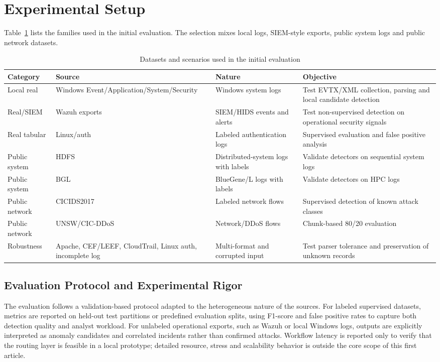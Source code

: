 \documentclass[conference]{IEEEtran}
\begin{document}
\section{Experimental Setup}
Table~\ref{tab:datasets} lists the families used in the initial evaluation. The selection mixes local logs, SIEM-style exports, public system logs and public network datasets.

\begin{table}[t]
\caption{Datasets and scenarios used in the initial evaluation}
\label{tab:datasets}
\centering
\scriptsize
\begin{tabularx}{\textwidth}{p{2.2cm}p{3.1cm}p{2.8cm}X}
\toprule
\textbf{Category} & \textbf{Source} & \textbf{Nature} & \textbf{Objective} \\
\midrule
Local real & Windows Event/Application/System/Security & Windows system logs & Test EVTX/XML collection, parsing and local candidate detection \\
Real/SIEM & Wazuh exports & SIEM/HIDS events and alerts & Test non-supervised detection on operational security signals \\
Real tabular & Linux/auth & Labeled authentication logs & Supervised evaluation and false positive analysis \\
Public system & HDFS & Distributed-system logs with labels & Validate detectors on sequential system logs \\
Public system & BGL & BlueGene/L logs with labels & Validate detectors on HPC logs \\
Public network & CICIDS2017 & Labeled network flows & Supervised detection of known attack classes \\
Public network & UNSW/CIC-DDoS & Network/DDoS flows & Chunk-based 80/20 evaluation \\
Robustness & Apache, CEF/LEEF, CloudTrail, Linux auth, incomplete log & Multi-format and corrupted input & Test parser tolerance and preservation of unknown records \\
\bottomrule
\end{tabularx}
\end{table}

\subsection{Evaluation Protocol and Experimental Rigor}
The evaluation follows a validation-based protocol adapted to the heterogeneous nature of the sources. For labeled supervised datasets, metrics are reported on held-out test partitions or predefined evaluation splits, using F1-score and false positive rates to capture both detection quality and analyst workload. For unlabeled operational exports, such as Wazuh or local Windows logs, outputs are explicitly interpreted as anomaly candidates and correlated incidents rather than confirmed attacks. Workflow latency is reported only to verify that the routing layer is feasible in a local prototype; detailed resource, stress and scalability behavior is outside the core scope of this first article.
\end{document}

